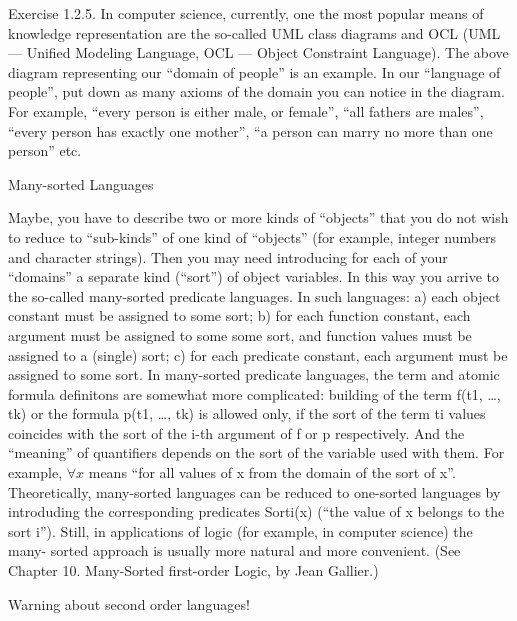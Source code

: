 \begin{exercise}
Exercise 1.2.5. In computer science, currently, one the most popular means of knowledge representation are the so-called UML class diagrams and OCL (UML --- Unified Modeling Language, OCL --- Object Constraint Language). The above diagram representing our ``domain of people'' is an example. In our ``language of people'', put down as many axioms of the domain you can notice in the diagram. For example, ``every person is either male, or female'', ``all fathers are males'', ``every person has exactly one mother'', ``a person can marry no more than one person'' etc. 
\end{exercise}

Many-sorted Languages

Maybe, you have to describe two or more kinds of ``objects'' that you do not wish to reduce to ``sub-kinds'' of one kind of ``objects'' (for example, integer numbers and character strings). Then you may need introducing for each of your ``domains'' a separate kind (``sort'') of object variables. In this way you arrive to the so-called many-sorted predicate languages. In such languages: a) each object constant must be assigned to some sort; b) for each function constant, each argument must be assigned to some some sort, and function values must be assigned to a (single) sort; c) for each predicate constant, each argument must be assigned to some sort. In many-sorted predicate languages, the term and atomic formula definitons are somewhat more complicated: building of the term f(t1, \ldots , tk) or the formula p(t1, \ldots , tk) is allowed only, if the sort of the term ti values coincides with the sort of the i-th argument of f or p respectively. And the ``meaning'' of quantifiers depends on the sort of the variable used with them. For example, \(\forall x\) means ``for all values of x from the domain of the sort of x''.  Theoretically, many-sorted languages can be reduced to one-sorted languages by introduding the corresponding predicates Sorti(x) (``the value of x belongs to the sort i''). Still, in applications of logic (for example, in computer science) the many- sorted approach is usually more natural and more convenient. (See Chapter 10. Many-Sorted first-order Logic, by Jean Gallier.)

Warning about second order languages!

